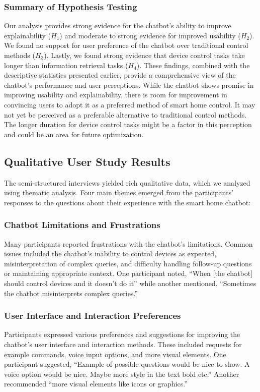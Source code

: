 \subsubsection{Summary of Hypothesis Testing}
Our analysis provides strong evidence for the chatbot's ability to improve explainability (\(H_1\)) and moderate to strong evidence for improved usability (\(H_2\)). We found no support for user preference of the chatbot over traditional control methods (\(H_3\)). Lastly, we found strong evidence that device control tasks take longer than information retrieval tasks (\(H_4\)).
These findings, combined with the descriptive statistics presented earlier, provide a comprehensive view of the chatbot's performance and user perceptions. While the chatbot shows promise in improving usability and explainability, there is room for improvement in convincing users to adopt it as a preferred method of smart home control. It may not yet be perceived as a preferable alternative to traditional control methods. The longer duration for device control tasks might be a factor in this perception and could be an area for future optimization.


\subsection{Qualitative User Study Results}
The semi-structured interviews yielded rich qualitative data, which we analyzed using thematic analysis. Four main themes emerged from the participants' responses to the questions about their experience with the smart home chatbot:
\subsubsection{Chatbot Limitations and Frustrations}
Many participants reported frustrations with the chatbot's limitations. Common issues included the chatbot's inability to control devices as expected, misinterpretation of complex queries, and difficulty handling follow-up questions or maintaining appropriate context. One participant noted, ``When [the chatbot] should control devices and it doesn't do it'' while another mentioned, ``Sometimes the chatbot misinterprets complex queries.''
\subsubsection{User Interface and Interaction Preferences}
Participants expressed various preferences and suggestions for improving the chatbot's user interface and interaction methods. These included requests for example commands, voice input options, and more visual elements. One participant suggested, ``Example of possible questions would be nice to show. A voice option would be nice. Maybe more style in the text bold etc.'' Another recommended ``more visual elements like icons or graphics.''
